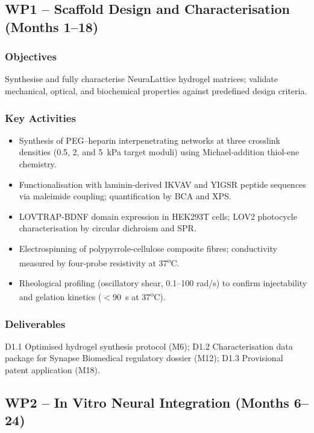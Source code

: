 \par
\vspace{8pt}

\subsection{WP1 -- Scaffold Design and Characterisation (Months 1--18)}

\subsubsection{Objectives}
Synthesise and fully characterise NeuraLattice hydrogel matrices; validate mechanical,
optical, and biochemical properties against predefined design criteria.

\subsubsection{Key Activities}
\begin{itemize}
  \item Synthesis of PEG--heparin interpenetrating networks at three crosslink densities
    (0.5, 2, and 5~kPa target moduli) using Michael-addition thiol-ene chemistry.
  \item Functionalisation with laminin-derived IKVAV and YIGSR peptide sequences via
    maleimide coupling; quantification by BCA and XPS.
  \item LOVTRAP-BDNF domain expression in HEK293T cells; LOV2 photocycle
    characterisation by circular dichroism and SPR.
  \item Electrospinning of polypyrrole-cellulose composite fibres; conductivity measured
    by four-probe resistivity at 37\textsuperscript{o}C.
  \item Rheological profiling (oscillatory shear, 0.1--100 rad/s) to confirm injectability
    and gelation kinetics (\(<\)90~s at 37\textsuperscript{o}C).
\end{itemize}

\subsubsection{Deliverables}
D1.1 Optimised hydrogel synthesis protocol (M6); D1.2 Characterisation data package for
Synapse Biomedical regulatory dossier (M12); D1.3 Provisional patent application
(M18).

\subsection{WP2 -- In Vitro Neural Integration (Months 6--24)}


